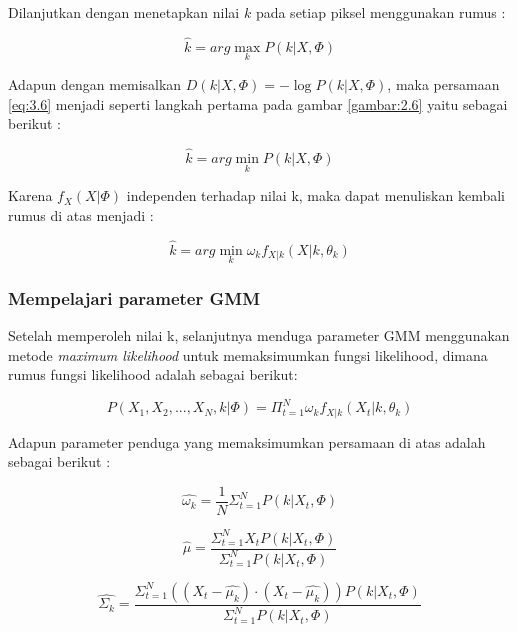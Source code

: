 Dilanjutkan dengan menetapkan nilai \(k\) pada setiap piksel menggunakan rumus :

\begin{equation} \label{eq:3.6}
	\hat{k} = arg \max_{k} P(k|X,\Phi) 
\end{equation}

Adapun dengan memisalkan \(D(k|X,\Phi) = - \log P(k|X,\Phi)\), maka persamaan \ref{eq:3.6}
menjadi seperti langkah pertama pada gambar \ref{gambar:2.6} yaitu sebagai berikut :

\begin{equation} \label{eq:3.6}
	\hat{k} = arg \min_{k} P(k|X,\Phi) 
\end{equation}


Karena \(f_X(X|\Phi)\) independen terhadap nilai k, maka dapat menuliskan kembali
rumus di atas menjadi : 

\begin{equation} \label{}
	\hat{k} = arg \min_{k} \omega_k f_{X|k} (X|k,\theta_k)
\end{equation}

\subsubsection{Mempelajari parameter GMM}

Setelah memperoleh nilai k, selanjutnya menduga parameter GMM menggunakan metode
\emph{maximum likelihood} untuk memaksimumkan fungsi likelihood, dimana rumus 
fungsi likelihood adalah sebagai berikut:

\begin{equation} \label{}
	P(X_1, X_2, ..., X_N, k | \Phi) = \Pi_{t=1}^N \omega_k f_{X|k}(X_t|k,\theta_k)
\end{equation}

Adapun parameter penduga yang memaksimumkan persamaan di atas adalah sebagai berikut :

\begin{equation} \label{}
	\hat{\omega_k} = \frac{1}{N} \Sigma_{t=1}^N P(k|X_t,\Phi)
\end{equation}

\begin{equation} \label{}
	\hat{\mu} = \frac{\Sigma_{t=1}^N X_t P(k|X_t,\Phi)}{\Sigma_{t=1}^N P(k|X_t,\Phi)} 
\end{equation}

\begin{equation} \label{}
	\hat{\Sigma_k} = \frac{\Sigma_{t=1}^N ((X_t - \hat{\mu_k}) \cdot (X_t - \hat{\mu_k})) P(k|X_t,\Phi)}{\Sigma_{t=1}^N P(k|X_t,\Phi)}
\end{equation}

